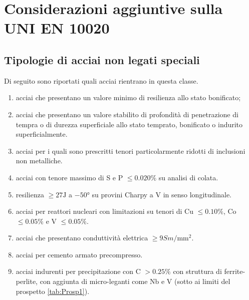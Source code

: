 
\chapter{Considerazioni aggiuntive sulla UNI EN 10020}\label{app:sus}
\section{Tipologie di acciai non legati speciali}\label{sec:ANLS}
Di seguito sono riportati quali acciai rientrano in questa classe. 
\begin{enumerate}
\item acciai che presentano un valore minimo di resilienza allo stato bonificato;
\item acciai che presentano un valore stabilito di profondità di penetrazione di tempra o di durezza superficiale allo stato temprato, bonificato o indurito superficialmente.
\item acciai per i quali sono prescritti tenori particolarmente ridotti di inclusioni non metalliche.
\item acciai con tenore massimo di S e P $\leq 0.020\%$ su analisi di colata.
\item resilienza $\geq 27\unit{\J}$ a $-50\unit{\degree}$ su provini Charpy a V in senso longitudinale.
\item acciai per reattori nucleari con limitazioni su tenori di Cu $\leq 0.10\%$, Co $\leq 0.05\%$ e V $\leq 0.05\%$.
\item acciai che presentano conduttività elettrica $\geq 9\unit{Sm/\mm^2}$.
\item acciai per cemento armato precompresso.
\item acciai indurenti per precipitazione con C $>0.25\%$ con struttura di ferrite-perlite, con aggiunta di micro-leganti come Nb e V (sotto ai limiti del prospetto \ref{tab:Prosp1}).
\end{enumerate}

